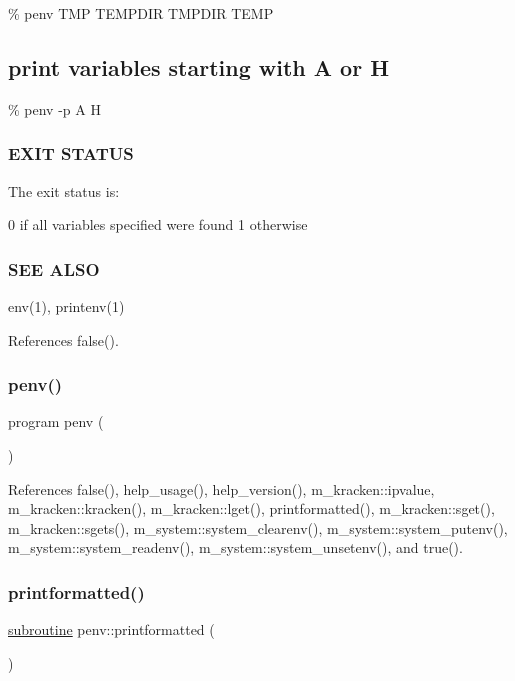 \% penv T\+MP T\+E\+M\+P\+D\+IR T\+M\+P\+D\+IR T\+E\+MP \subsection*{print variables starting with A or H}

\% penv -\/p A H

\subsubsection*{E\+X\+IT S\+T\+A\+T\+US}

The exit status is\+:

0 if all variables specified were found 1 otherwise \subsubsection*{S\+EE A\+L\+SO}

env(1), printenv(1) 

References false().

\mbox{\label{penv_8f90_a01dea0dd27ab167506a724b2d0aeb2b5}} 
\subsubsection{\texorpdfstring{penv()}{penv()}}
{\footnotesize\ttfamily program penv (\begin{DoxyParamCaption}{ }\end{DoxyParamCaption})}



References false(), help\+\_\+usage(), help\+\_\+version(), m\+\_\+kracken\+::ipvalue, m\+\_\+kracken\+::kracken(), m\+\_\+kracken\+::lget(), printformatted(), m\+\_\+kracken\+::sget(), m\+\_\+kracken\+::sgets(), m\+\_\+system\+::system\+\_\+clearenv(), m\+\_\+system\+::system\+\_\+putenv(), m\+\_\+system\+::system\+\_\+readenv(), m\+\_\+system\+::system\+\_\+unsetenv(), and true().

\mbox{\label{penv_8f90_a53f464ba778289ef53d33f9c0e2130c0}} 
\subsubsection{\texorpdfstring{printformatted()}{printformatted()}}
{\footnotesize\ttfamily \hyperlink{M__stopwatch_83_8txt_acfbcff50169d691ff02d4a123ed70482}{subroutine} penv\+::printformatted (\begin{DoxyParamCaption}{ }\end{DoxyParamCaption})}



